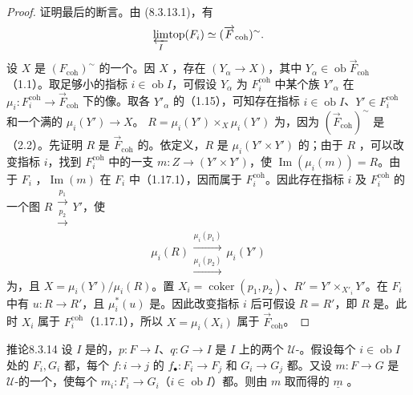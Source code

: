 \begin{proof}
证明最后的断言。由 (8.3.13.1)，有
\[\varprojlim_I\!\operatorname{top}(F_i)\simeq(\overrightarrow F_{\mathrm{coh}})^\sim.\]
设 $X$ 是 $(F_{\mathrm{coh}})^\sim$ 的一个。因 $X$ ，存在 $(Y_\alpha\to X)$，其中 $Y_\alpha\in\operatorname{ob}\overrightarrow F_{\mathrm{coh}}$（1.1）。取足够小的指标 $i\in\operatorname{ob}I$，可假设 $Y_\alpha$ 为 $F_i^{\mathrm{coh}}$ 中某个族 $Y'_\alpha$ 在 $\mu_i:F_i^{\mathrm{coh}}\to\overrightarrow F_{\mathrm{coh}}$ 下的像。取各 $Y'_\alpha$ 的（1.15），可知存在指标 $i\in\operatorname{ob}I$、$Y'\in F_i^{\mathrm{coh}}$ 和一个满的 $\mu_i(Y')\to X$。 $R=\mu_i(Y')\times_X\mu_i(Y')$ 为，因为 $(\overrightarrow F_{\mathrm{coh}})^\sim$ 是（2.2）。先证明 $R$ 是 $\overrightarrow F_{\mathrm{coh}}$ 的。依定义，$R$ 是 $\mu_i(Y'\times Y')$ 的；由于 $R$ ，可以改变指标 $i$，找到 $F_i^{\mathrm{coh}}$ 中的一支 $m:Z\to(Y'\times Y')$，使 $\operatorname{Im}(\mu_i(m))=R$。由于 $F_i$ ，$\operatorname{Im}(m)$ 在 $F_i$ 中（1.17.1），因而属于 $F_i^{\mathrm{coh}}$。因此存在指标 $i$ 及 $F_i^{\mathrm{coh}}$ 的一个图 $R\mathrel{\substack{\xrightarrow{p_1}\\[-.7ex]\xrightarrow{p_2}}}Y'$，使
\[\mu_i(R)\mathrel{\substack{\xrightarrow{\mu_i(p_1)}\\[-.7ex]\xrightarrow{\mu_i(p_2)}}}\mu_i(Y')\]
为，且 $X=\mu_i(Y')/\mu_i(R)$。置 $X_i=\operatorname{coker}(p_1,p_2)$、$R'=Y'\times_{X'_i}Y'$。在 $F_i$ 中有 $u:R\to R'$，且 $\mu_i^*(u)$ 是。因此改变指标 $i$ 后可假设 $R=R'$，即 $R$ 是。此时 $X_i$ 属于 $F_i^{\mathrm{coh}}$（1.17.1），所以 $X=\mu_i(X_i)$ 属于 $\overrightarrow F_{\mathrm{coh}}$。
\end{proof}
\begin{SGAresult}{推论}{8.3.14}
设 $I$ 是的，$p:F\to I$、$q:G\to I$ 是 $I$ 上的两个 $\mathcal U$-。假设每个 $i\in\operatorname{ob}I$ 处的 $F_i,G_i$ 都，每个 $f:i\to j$ 的 $f_\bullet:F_i\to F_j$ 和 $G_i\to G_j$ 都。又设 $m:F\to G$ 是 $\mathcal U$-的一个，使每个 $m_i:F_i\to G_i$（$i\in\operatorname{ob}I$）都。则由 $m$ 取而得的 $\underline m$ 。
\end{SGAresult}
